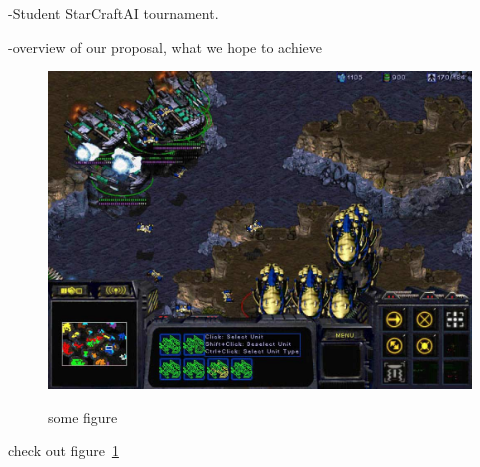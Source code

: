 -Student StarCraftAI tournament.

-overview of our proposal, what we hope to achieve

\begin{figure}
\centering
\includegraphics[scale=0.4, trim = 0cm 0cm 0cm 0cm]{images/test}
\label{fig:test}
\caption{some figure}
\end{figure}


check out figure~\ref{fig:test}